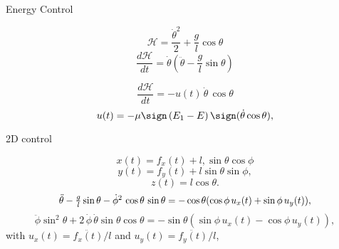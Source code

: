 \documentclass{beamer}
\begin{document}
\begin{frame}{Energy Control}


\begin{equation}
    \mathcal{H}=\frac{\dot{\theta}^2}{2}+ \frac{g}{l}\cos{\theta}
\end{equation}
\begin{equation}
 \frac{d\mathcal{H}}{dt}=\dot{\theta}\left(\ddot{\theta}-\frac{g}{l}\sin{\theta}\right)   
\end{equation}

\begin{equation}
    \frac{d\mathcal{H}}{dt}=-u(t) \,\dot{\theta}\,\cos{\theta}
    \label{control1d}
\end{equation}
\begin{equation}
    u(t)=-\mu  \sign\left({E_1-E}\right) \sign(\dot{\theta} \cos{\theta}),
    \label{u1d}
\end{equation}
\end{frame}


\begin{frame}{2D control}


\begin{equation}
x(t) =f_x(t)+ l, \sin{\theta}\cos{\phi}   
\end{equation}
\begin{equation}
  y(t)=f_y(t)+l\sin{\theta}\sin{\phi} ,
\end{equation}
\begin{equation}
    z(t)=l \cos{\theta}.
\end{equation}
\begin{equation}
\scalebox{0.95}[1]{$\ddot{\theta}-\frac{g}{l}\sin{\theta}- \dot{\phi}^2\, \cos{\theta}\,\sin\theta =-\cos{\theta} (\cos{\phi}\, u_x(t)+ \sin{\phi}\, u_y(t)),$}  
\label{teta2d}
\end{equation}
\begin{equation}
  \ddot{\phi}\sin^2{\theta} +2 \, \dot{\phi} \,\dot{\theta}\sin{\theta} \cos{\theta}= -\sin{\theta}(\sin{\phi}\, u_x(t) - \cos{\phi} \,u_y(t)),
  \label{phi2d}
\end{equation}
with $u_x(t)=\ddot{f_x(t)}/l$ and $u_y(t)=\ddot{f_y(t)}/l$,



\end{frame}
\end{document}
